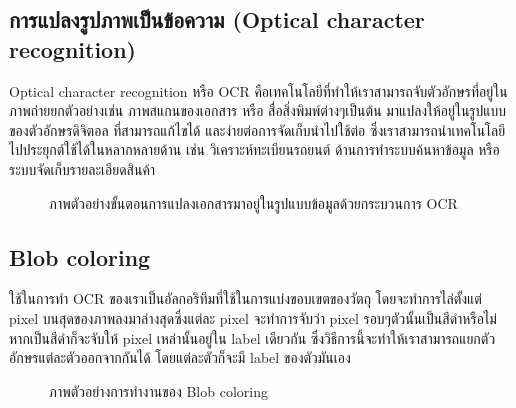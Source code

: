 \documentclass[12pt,oneside,openright,a4paper]{cpe-thai-project}
\begin{document}
\newpage
\subsection{การแปลงรูปภาพเป็นข้อความ (Optical character recognition)}
Optical character recognition หรือ OCR คือเทคโนโลยีที่ทำให้เราสามารถจับตัวอักษรที่อยู่ในภาพถ่ายยกตัวอย่างเช่น ภาพสแกนของเอกสาร หรือ สื่อสิ่งพิมพ์ต่างๆเป็นต้น มาแปลงให้อยู่ในรูปแบบของตัวอักษรดิจิตอล
 ที่สามารถแก้ไขได้ และง่ายต่อการจัดเก็บนำไปใช้ต่อ ซึ่งเราสามารถนำเทคโนโลยีไปประยุกต์ใช้ได้ในหลากหลายด้าน เช่น วิเคราะห์ทะเบียนรถยนต์ ด้านการทำระบบค้นหาข้อมูล หรือระบบจัดเก็บรายละเอียดสินค้า

\begin{figure}[!ht]\centering
  \setlength{\fboxrule}{0.2mm} %
  \setlength{\fboxsep}{1cm}
  \caption{ภาพตัวอย่างขั้นตอนการแปลงเอกสารมาอยู่ในรูปแบบข้อมูลด้วยกระบวนการ OCR}\label{fig:ocr}
\end{figure}

\subsection{Blob coloring}
ใช้ในการทำ OCR ของเราเป็นอัลกอริทึมที่ใช้ในการแบ่งขอบเขตของวัตถุ โดยจะทำการไล่ตั้งแต่ pixel บนสุดของภาพลงมาล่างสุดซึ่งแต่ละ
 pixel จะทำการจับว่า pixel รอบๆตัวนั้นเป็นสีดำหรือไม่ หากเป็นสีดำก็จะจับให้ pixel เหล่านั้นอยู่ใน label เดียวกัน ซึ่งวิธีการนี้จะทำให้เราสามารถแยกตัวอักษรแต่ละตัวออกจากกันได้ โดยแต่ละตัวก็จะมี label ของตัวมันเอง

\begin{figure}[!ht]\centering
  \setlength{\fboxrule}{0.2mm} %
  \setlength{\fboxsep}{1cm}
  \caption{ภาพตัวอย่างการทำงานของ Blob coloring}\label{fig:blob}
\end{figure}
\end{document}
